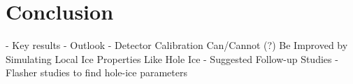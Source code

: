 
\section{Conclusion}
\label{sec:conclusion}

- Key results
- Outlook
- Detector Calibration Can/Cannot (?) Be Improved by Simulating Local Ice Properties Like Hole Ice
- Suggested Follow-up Studies
  - Flasher studies to find hole-ice parameters

